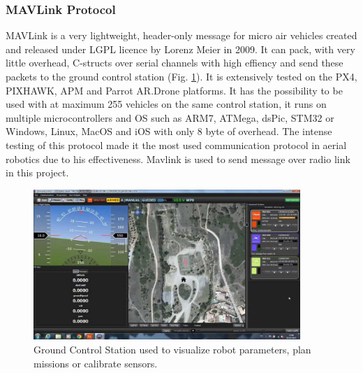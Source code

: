 \subsubsection{MAVLink Protocol}
\label{sec:mavlink}
MAVLink is a very lightweight, header-only message for micro air vehicles created and released under LGPL licence by Lorenz Meier in 2009.
It can pack, with very little overhead, C-structs over serial channels with high effiency and send these packets to the ground control station (Fig. \ref{figure:controlstation}). It is extensively tested on the PX4, PIXHAWK, APM and Parrot AR.Drone platforms. It has the possibility to be used with at maximum 255 vehicles on the same control station, it runs on multiple microcontrollers and OS such as  ARM7, ATMega, dsPic, STM32 or Windows, Linux, MacOS and iOS with only 8 byte of overhead. The intense testing of this protocol made it the most used communication protocol in aerial robotics due to his effectiveness. Mavlink is used to send message over radio link in this project.
\begin{figure}[H]
 \centering
 \includegraphics[width=0.9\textwidth]{groundcontrol.jpg}
 \caption[Ground Control Station]{Ground Control Station used to visualize robot parameters, plan missions or calibrate sensors.}
 \label{figure:controlstation}
\end{figure}


